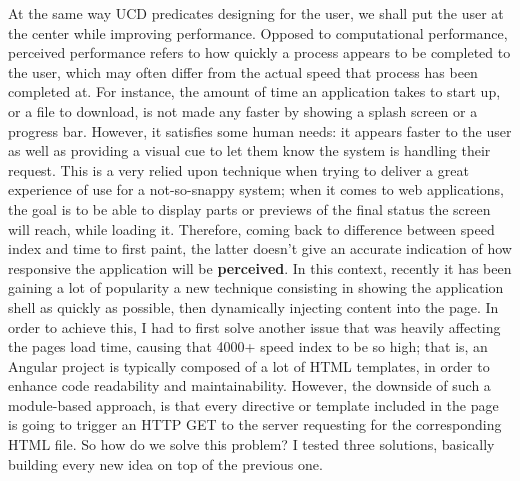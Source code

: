 \documentclass[12pt,oneside,svgnames]{memoir}
\begin{document}
At the same way UCD predicates designing for the user, we shall put the
user at the center while improving performance. Opposed to computational
performance, perceived performance refers to how quickly a process
appears to be completed to the user, which may often differ from the
actual speed that process has been completed at. For instance, the
amount of time an application takes to start up, or a file to download,
is not made any faster by showing a splash screen or a progress bar.
However, it satisfies some human needs: it appears faster to the user as
well as providing a visual cue to let them know the system is handling
their request. This is a very relied upon technique when trying to
deliver a great experience of use for a not-so-snappy system; when it
comes to web applications, the goal is to be able to display parts or
previews of the final status the screen will reach, while loading it.
Therefore, coming back to difference between speed index and time to
first paint, the latter doesn't give an accurate indication of how
responsive the application will be \textbf{perceived}. In this context,
recently it has been gaining a lot of popularity a new technique
consisting in showing the application shell as quickly as possible, then
dynamically injecting content into the page. In order to achieve this, I
had to first solve another issue that was heavily affecting the pages
load time, causing that 4000+ speed index to be so high; that is, an
Angular project is typically composed of a lot of HTML templates, in
order to enhance code readability and maintainability. However, the
downside of such a module-based approach, is that every directive or
template included in the page is going to trigger an HTTP GET to the
server requesting for the corresponding HTML file. So how do we solve
this problem? I tested three solutions, basically building every new
idea on top of the previous one.
\end{document}
